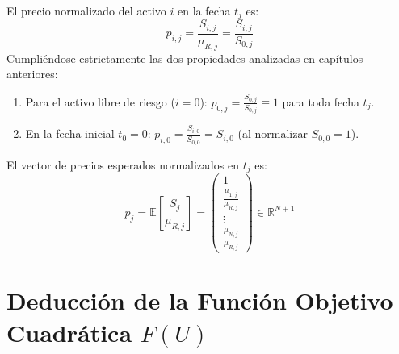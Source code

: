 \documentclass[11pt,a4paper]{report}
\numberwithin{equation}{chapter}
\begin{document}
El precio normalizado del activo $i$ en la fecha $t_j$ es:
\begin{equation}
    p_{i,j} = \frac{S_{i,j}}{\mu_{R,j}} = \frac{S_{i,j}}{S_{0,j}}
\end{equation}
Cumpliéndose estrictamente las dos propiedades analizadas en capítulos anteriores:
\begin{enumerate}
    \item Para el activo libre de riesgo ($i=0$): $p_{0,j} = \frac{S_{0,j}}{S_{0,j}} \equiv 1$ para toda fecha $t_j$.
    \item En la fecha inicial $t_0 = 0$: $p_{i,0} = \frac{S_{i,0}}{S_{0,0}} = S_{i,0}$ (al normalizar $S_{0,0}=1$).
\end{enumerate}

El vector de precios esperados normalizados en $t_j$ es:
\begin{equation}
    p_j = \mathbb{E}\left[ \frac{S_j}{\mu_{R,j}} \right] = \begin{pmatrix} 1 \\ \frac{\mu_{1,j}}{\mu_{R,j}} \\ \vdots \\ \frac{\mu_{N,j}}{\mu_{R,j}} \end{pmatrix} \in \mathbb{R}^{N+1}
\end{equation}

\section{Deducción de la Función Objetivo Cuadrática $F(U)$}
\end{document}
